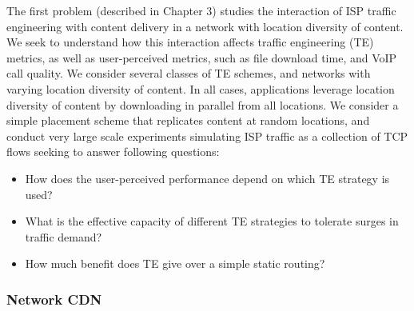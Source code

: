 The first problem (described in Chapter 3) studies the interaction of ISP traffic engineering with content delivery in a network with location diversity of content. 
We seek to understand how this interaction affects traffic engineering (TE) metrics, as well as user-perceived metrics, such as file download time, and VoIP call quality.
We consider several classes of TE schemes, and networks with varying location diversity of content. 
In all cases, applications leverage location diversity of content by downloading in parallel from all locations.
We consider a simple placement scheme that replicates content at random locations, and conduct very large scale experiments simulating ISP traffic as a collection of TCP flows seeking to answer following questions:
\begin{itemize}
\item
How does the user-perceived performance depend on which TE strategy is used?
\item
What is the effective capacity of different TE strategies to tolerate surges in traffic demand?
\item
How much benefit does TE give over a simple static routing?
\end{itemize}







\subsubsection{Network CDN}


